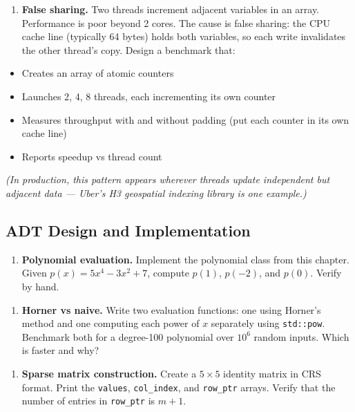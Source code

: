 \begin{enumerate}
\item \textbf{False sharing.} Two threads increment adjacent variables in an array. Performance is poor beyond 2 cores. The cause is false sharing: the CPU cache line (typically 64 bytes) holds both variables, so each write invalidates the other thread's copy. Design a benchmark that:
\end{enumerate}
\begin{itemize}
\item Creates an array of atomic counters
\item Launches 2, 4, 8 threads, each incrementing its own counter
\item Measures throughput with and without padding (put each counter in its own cache line)
\item Reports speedup vs thread count
\end{itemize}

     \textit{(In production, this pattern appears wherever threads update independent but adjacent data — Uber's H3 geospatial indexing library is one example.)}

\subsection{ADT Design and Implementation}

\begin{enumerate}
\item \textbf{Polynomial evaluation.} Implement the polynomial class from this chapter. Given $p(x) = 5x^{4} - 3x^{2} + 7$, compute $p(1)$, $p(-2)$, and $p(0)$. Verify by hand.
\end{enumerate}

\begin{enumerate}
\item \textbf{Horner vs naive.} Write two evaluation functions: one using Horner's method and one computing each power of $x$ separately using \texttt{std::pow}. Benchmark both for a degree-100 polynomial over $10^{6}$ random inputs. Which is faster and why?
\end{enumerate}

\begin{enumerate}
\item \textbf{Sparse matrix construction.} Create a $5 \times 5$ identity matrix in CRS format. Print the \texttt{values}, \texttt{col\_index}, and \texttt{row\_ptr} arrays. Verify that the number of entries in \texttt{row\_ptr} is $m + 1$.
\end{enumerate}

